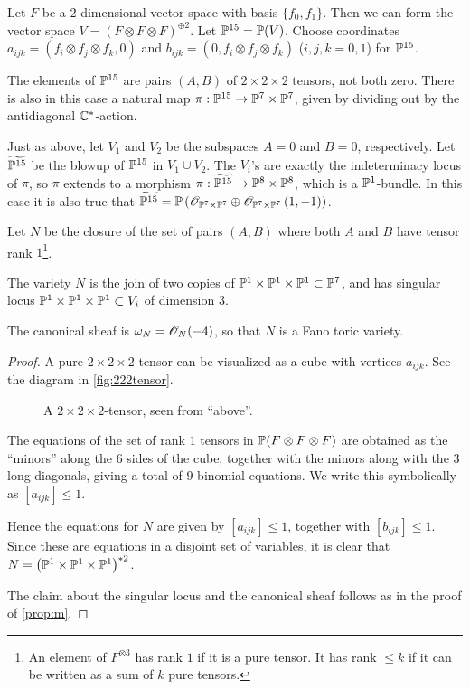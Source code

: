 Let $F$ be a $2$-dimensional vector space with basis $\{f_0,f_1\}$. Then we can form the vector space $V = (F \otimes F \otimes F)^{\oplus 2}$. Let $\P^{15}=\P(V)$. Choose coordinates $a_{ijk}=(f_i \otimes f_j \otimes f_k,0)$ and $b_{ijk}=(0,f_i\otimes f_j \otimes f_k)$ ($i,j,k=0,1$) for $\P^{15}$. 

The elements of $\P^{15}$ are pairs $(A,B)$ of $2 \times 2 \times 2$ tensors, not both zero. There is also in this case a natural map $\pi:\P^{15} \to \P^7 \times \P^7$, given by dividing out by the antidiagonal $\C^\ast$-action.

\begin{remark}
Just as above, let $V_1$ and $V_2$ be the subspaces $A=0$ and $B=0$, respectively. Let $\widetilde{\P^{15}}$ be the blowup of $\P^{15}$ in $V_1 \cup V_2$. The $V_i$'s are exactly the indeterminacy locus of $\pi$, so $\pi$ extends to a morphism $\pi:\widetilde{\P^{15}} \to \P^8 \times \P^8$, which is a $\P^1$-bundle. In this case it is also true that $\widetilde{\P^{15}}=\P\left(\OO_{\P^7 \times \P^7} \oplus \OO_{\P^7 \times \P^7}\left(1,-1\right)\right)$.
\end{remark}

Let $N$ be the closure of the set of pairs $(A,B)$ where both $A$ and $B$ have tensor rank $1$\footnote{An element of $F^{\otimes 3}$ has rank $1$ if it is a pure tensor. It has rank $\leq k$ if it can be written as a sum of $k$ pure tensors.}.

\begin{proposition}
The variety $N$ is the join of two copies of $\P^1 \times \P^1 \times \P^1 \subset \P^7$, and has singular locus $\P^1 \times \P^1 \times \P^1 \subset V_i$ of dimension $3$.

The canonical sheaf is $\omega_N = \OO_N(-4)$, so that $N$ is a Fano toric variety.
\end{proposition}

\begin{proof}
A pure $2 \times 2 \times 2$-tensor can be visualized as a cube with vertices $a_{ijk}$. See the diagram in \vref{fig:222tensor}. 

\begin{figure}[t]
\centering

\caption{A $2 \times 2 \times 2$-tensor, seen from ``above''.}
\label{fig:222tensor}
\end{figure}

The equations of the set of rank $1$ tensors in $\P(F \otimes F \otimes F)$ are obtained as the ``minors'' along the $6$ sides of the cube, together with the minors along with the $3$ long diagonals, giving a total of $9$ binomial equations. We write this symbolically as $[a_{ijk}] \leq 1$. 

Hence the equations for $N$ are given by $[a_{ijk}] \leq 1$, together with $[b_{ijk}] \leq 1$. Since these are equations in a disjoint set of variables, it is clear that ${N=\left(\P^1 \times \P^1 \times \P^1\right)^{\ast 2}}$.

The claim about the singular locus and the canonical sheaf follows as in the proof of \cref{prop:m}.
\end{proof}

